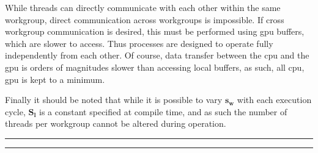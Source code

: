     While threads can directly communicate with each other within the same workgroup, direct communication across workgroups is
    impossible. If cross workgroup communication is desired, this must be performed using \ac{gpu} buffers, which are slower to access. Thus processes are
    designed to operate fully independently from each other. Of course, data transfer between the \ac{cpu} and the \ac{gpu} is orders of magnitudes
    slower than accessing local buffers, as such, all \ac{cpu}, \ac{gpu} is kept to a minimum.
    
    Finally it should be noted that while it is possible to vary \(\bm{s_w}\) with each execution cycle, \(\bm{S_l}\) is a constant specified at compile time,
    and as such the number of threads per workgroup cannot be altered during operation.

\bigskip
\hrule
\smallbreak
\hrule
